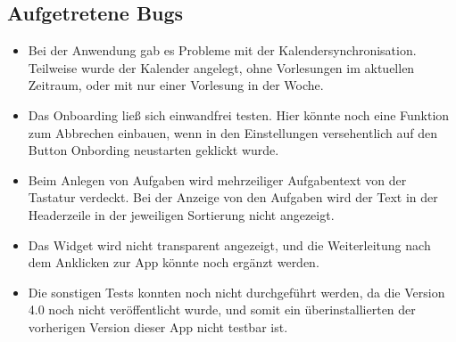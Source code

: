 \subsection{Aufgetretene Bugs}
\begin{itemize}
\item Bei der Anwendung gab es Probleme mit der Kalendersynchronisation. Teilweise wurde der Kalender angelegt, ohne Vorlesungen im aktuellen Zeitraum, oder mit nur einer Vorlesung in der Woche.
\item Das Onboarding ließ sich einwandfrei testen. Hier könnte noch eine Funktion zum Abbrechen einbauen, wenn in den Einstellungen versehentlich auf den Button Onbording neustarten geklickt wurde.
\item Beim Anlegen von Aufgaben wird mehrzeiliger Aufgabentext von der Tastatur verdeckt. Bei der Anzeige von den Aufgaben wird der Text in der Headerzeile in der jeweiligen Sortierung nicht angezeigt.
\item Das Widget wird nicht transparent angezeigt, und die Weiterleitung nach dem Anklicken zur App könnte noch ergänzt werden.
\item Die sonstigen Tests konnten noch nicht durchgeführt werden, da die Version 4.0 noch nicht veröffentlicht wurde, und somit ein überinstallierten der vorherigen Version dieser App nicht testbar ist.
\end{itemize}
